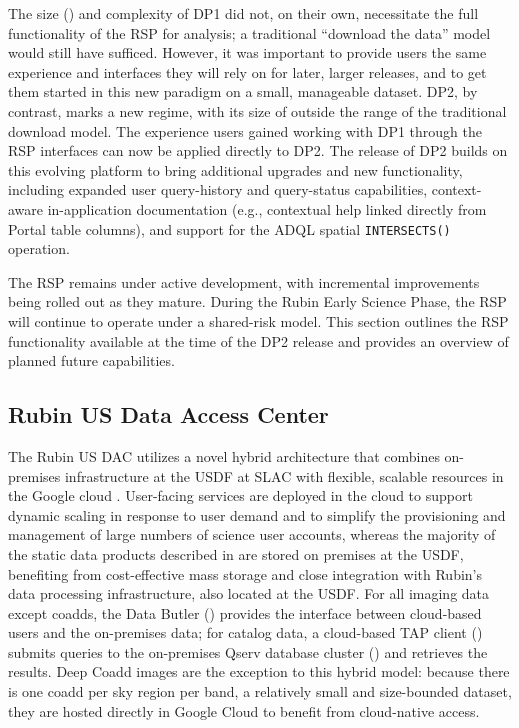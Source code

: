 The size (\dponesize) and complexity of \gls{DP1} did not, on their own, necessitate the full functionality of the \gls{RSP} for analysis; a traditional ``download the data'' model would still have sufficed.
However, it was important to provide users the same experience and interfaces they will rely on for later, larger releases, and to get them started in this new paradigm on a small, manageable dataset.
\gls{DP2}, by contrast, marks a new regime, with its size of \edptwosize outside the range of the traditional download model.
The experience users gained working with \gls{DP1} through the \gls{RSP} interfaces can now be applied directly to \gls{DP2}.
The release of \gls{DP2} builds on this evolving platform to bring additional upgrades and new functionality, including expanded user query-history and query-status capabilities, context-aware in-application documentation (e.g., contextual help linked directly from Portal table columns), and support for the \gls{ADQL} spatial \texttt{INTERSECTS()} operation.


The \gls{RSP} remains under active development, with incremental improvements being rolled out as they mature.
During the Rubin Early Science Phase, the \gls{RSP} will continue to operate under a shared-risk model.
This section outlines the RSP functionality available at the time of the \gls{DP2} release and provides an overview of planned future capabilities.

\subsection{Rubin US Data Access Center}
\label{ssec:usdac}
%
The Rubin US DAC utilizes a novel hybrid architecture that combines on-premises infrastructure at the \gls{USDF} at SLAC with flexible, scalable resources in the Google cloud \citep[][]{2024SPIE13101E..2BO}.
User-facing services are deployed in the cloud to support dynamic scaling in response to user demand and to simplify the provisioning and management of large numbers of science user accounts, whereas the majority of the static data products described in  are stored on premises at the \gls{USDF}, benefiting from cost-effective mass storage and close integration with Rubin's data processing infrastructure, also located at the \gls{USDF}.
For all imaging data except coadds, the Data Butler () provides the interface between cloud-based users and the on-premises data; for catalog data, a cloud-based \gls{TAP} client () submits queries to the on-premises \gls{Qserv} database cluster () and retrieves the results.
Deep Coadd images are the exception to this hybrid model: because there is one coadd per sky region per band, a relatively small and size-bounded dataset, they are hosted directly in Google Cloud to benefit from cloud-native access.

